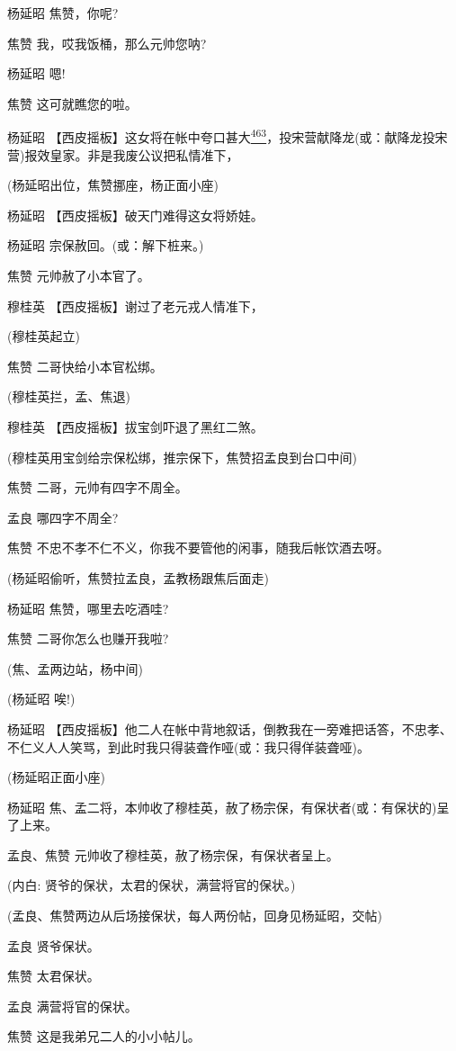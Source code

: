 杨延昭 焦赞，你呢?

焦赞 我，哎我饭桶，那么元帅您呐?

杨延昭 嗯!

焦赞 这可就瞧您的啦。

杨延昭
【西皮摇板】这女将在帐中夸口甚大\protect\hyperlink{fn463}{\textsuperscript{463}}，投宋营献降龙(或：献降龙投宋营)报效皇家。非是我废公议把私情准下，

(杨延昭出位，焦赞挪座，杨正面小座)

杨延昭 【西皮摇板】破天门难得这女将娇娃。

杨延昭 宗保赦回。(或：解下桩来。)

焦赞 元帅赦了小本官了。

穆桂英 【西皮摇板】谢过了老元戎人情准下，

(穆桂英起立)

焦赞 二哥快给小本官松绑。

(穆桂英拦，孟、焦退)

穆桂英 【西皮摇板】拔宝剑吓退了黑红二煞。

(穆桂英用宝剑给宗保松绑，推宗保下，焦赞招孟良到台口中间)

焦赞 二哥，元帅有四字不周全。

孟良 哪四字不周全?

焦赞 不忠不孝不仁不义，你我不要管他的闲事，随我后帐饮酒去呀。

(杨延昭偷听，焦赞拉孟良，孟教杨跟焦后面走)

杨延昭 焦赞，哪里去吃酒哇?

焦赞 二哥你怎么也赚开我啦?

(焦、孟两边站，杨中间)

(杨延昭 唉!)

杨延昭
【西皮摇板】他二人在帐中背地叙话，倒教我在一旁难把话答，不忠孝、不仁义人人笑骂，到此时我只得装聋作哑(或：我只得佯装聋哑)。

(杨延昭正面小座)

杨延昭
焦、孟二将，本帅收了穆桂英，赦了杨宗保，有保状者(或：有保状的)呈了上来。

孟良、焦赞 元帅收了穆桂英，赦了杨宗保，有保状者呈上。

(内白: 贤爷的保状，太君的保状，满营将官的保状。)

(孟良、焦赞两边从后场接保状，每人两份帖，回身见杨延昭，交帖)

孟良 贤爷保状。

焦赞 太君保状。

孟良 满营将官的保状。

焦赞 这是我弟兄二人的小小帖儿。

